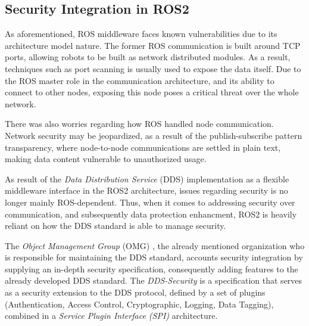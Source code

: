 
\subsection{Security Integration in ROS2}

As aforementioned, ROS middleware faces known vulnerabilities due to its architecture model nature. The former ROS communication is built around TCP ports, allowing robots to be built as network distributed modules. As a result, techniques such as port scanning is usually used to expose the data itself. Due to the ROS master role in the communication architecture, and its ability to connect to other nodes, exposing this node poses a critical threat over the whole network. \cite{8794451} 

There was also worries regarding how ROS handled node communication. Network security may be jeopardized, as a result of the publish-subscribe pattern transparency, where node-to-node communications are settled in plain text, making data content vulnerable to unauthorized usage. \cite{kim2018security}

As result of the \textit{Data Distribution Service} (DDS) implementation as a flexible middleware interface in the ROS2 architecture, issues regarding security is no longer mainly ROS-dependent. Thus, when it comes to addressing security over communication, and subsequently data protection enhancment, ROS2 is heavily reliant on how the DDS standard is able to manage security. \cite{kim2018security, 8794451}

The \textit{Object Management Group} (OMG) \cite{3}, the already mentioned organization who is responsible for maintaining the DDS standard, accounts security integration by supplying an in-depth security specification, consequently adding features to the already developed DDS standard. The \textit{DDS-Security} is a specification that serves as a security extension to the DDS protocol, defined by a set of plugins (Authentication, Access Control, Cryptographic, Logging, Data Tagging), combined in a \textit{Service Plugin Interface (SPI)} architecture. \cite{8442103, ros-dds-integration}

